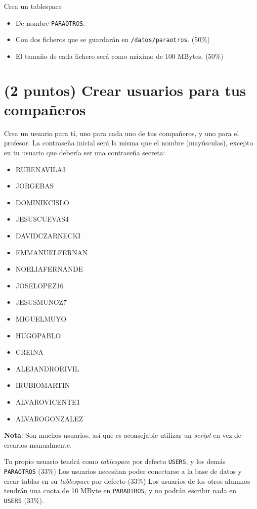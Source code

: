 \documentclass[a4paper]{article}
\begin{document}
Crea un tablespace
\begin{itemize}
\item De nombre \texttt{PARAOTROS}.
\item Con dos ficheros que se guardarán en \texttt{/datos/paraotros}. (50\%)
\item El tamaño de cada fichero será como máximo de 100 MBytes. (50\%)
\end{itemize}

\section{(2 puntos) Crear usuarios para tus compañeros}
\label{sec:org0000006}

Crea un usuario para tí, uno para cada uno de tus compañeros, y uno para el profesor. La contraseña inicial será la misma que el nombre (mayúsculas), excepto en tu usuario que debería ser una contraseña secreta:
\begin{multicols}{3}
\begin{itemize}
\item RUBENAVILA3
\item JORGEBAS
\item DOMINIKCISLO
\item JESUSCUEVAS4
\item DAVIDCZARNECKI
\item EMMANUELFERNAN
\item NOELIAFERNANDE
\item JOSELOPEZ16
\item JESUSMUNOZ7
\item MIGUELMUYO
\item HUGOPABLO
\item CREINA
\item ALEJANDRORIVIL
\item IRUBIOMARTIN
\item ALVAROVICENTE1
\item ALVAROGONZALEZ
\end{itemize}
\end{multicols}
\textbf{Nota}: Son muchos usuarios, así que es aconsejable utilizar un \emph{script} en vez de crearlos manualmente.

Tu propio usuario tendrá como \emph{tablespace} por defecto \texttt{USERS}, y los demás \texttt{PARAOTROS} (33\%)
Los usuarios necesitan poder conectarse a la base de datos y crear tablas en su \emph{tablespace} por defecto (33\%)
Los usuarios de los otros alumnos tendrán una cuota de 10 MByte en \texttt{PARAOTROS}, y no podrán escribir nada en \texttt{USERS} (33\%).
\end{document}
